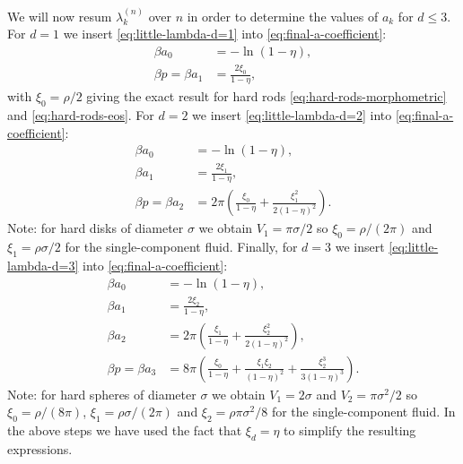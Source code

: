 \documentclass[11pt,twoside]{report}
\def\includebibliography{}
\begin{document}
We will now resum $\lambda_k^{(n)}$ over $n$ in order to determine the values of $a_k$ for $d \le 3$.
For $d=1$ we insert \eqref{eq:little-lambda-d=1} into \eqref{eq:final-a-coefficient}:
\begin{subequations}
  \begin{align}
    \beta a_0
    &= - \ln{(1 - \eta)},
    \\
    \beta p =
    \beta a_1 &=
    \frac{2 \xi_0}{1-\eta},
  \end{align}
\end{subequations}
with $\xi_0 = \rho / 2$ giving the exact result for hard rods \eqref{eq:hard-rods-morphometric} and \eqref{eq:hard-rods-eos}.
For $d=2$ we insert \eqref{eq:little-lambda-d=2} into \eqref{eq:final-a-coefficient}:
\begin{subequations}
  \begin{align}
    \beta a_0 &= -\ln{(1 - \eta)},
    \\
    \beta a_1 &= \frac{2 \xi_1}{1-\eta},
    \\
    \beta p =
    \beta a_2 &=
    2\pi \left(
    \frac{\xi_0}{1-\eta}
    + \frac{\xi_1^2}{2(1-\eta)^2}
    \right).
  \end{align}
\end{subequations}
Note: for hard disks of diameter $\sigma$ we obtain $V_1 = \pi \sigma / 2$ so $\xi_0 = \rho / (2\pi)$ and $\xi_1 = \rho \sigma / 2$ for the single-component fluid.
Finally, for $d=3$ we insert \eqref{eq:little-lambda-d=3} into \eqref{eq:final-a-coefficient}:
\begin{subequations}
  \begin{align}
    \beta a_0 &= -\ln{(1 - \eta)},
    \\
    \beta a_1 &= \frac{2 \xi_2}{1-\eta},
    \\
    \beta a_2 &=
    2 \pi
    \left(
    \frac{\xi_1}{1-\eta}
    + \frac{\xi_2^2}{2(1-\eta)^2}
    \right),
    \\
    \beta p =
    \beta a_3 &=
    8 \pi\left(
    \frac{\xi_0}{1-\eta}
    + \frac{\xi_1 \xi_2}{(1-\eta)^2}
    + \frac{\xi_2^3}{3 (1-\eta)^3}
    \right).
    \label{eq:a3-d=3}
  \end{align}
\end{subequations}
Note: for hard spheres of diameter $\sigma$ we obtain $V_1 = 2\sigma$ and $V_2 = \pi \sigma^2 / 2$ so $\xi_0 = \rho / (8\pi)$, $\xi_1 = \rho \sigma / (2\pi)$ and $\xi_2 = \rho \pi \sigma^2 / 8$ for the single-component fluid.
In the above steps we have used the fact that $\xi_d = \eta$ to simplify the resulting expressions.

\ifdefined\includebibliography
  \printbibliography
\fi
\end{document}
